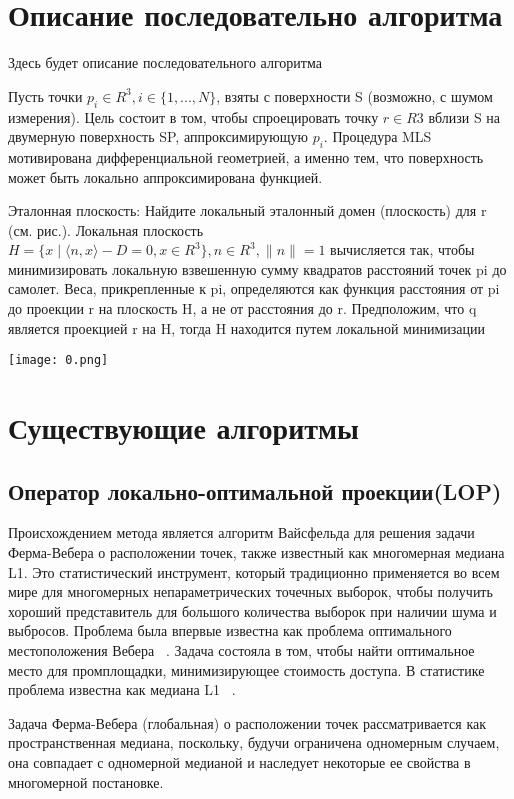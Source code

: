 

\section{Описание последовательно алгоритма}
Здесь будет описание последовательного алгоритма  

Пусть точки $p_i \in R^{3}, i \in \{1, . . . , N\}$, взяты с
поверхности S (возможно, с шумом измерения). Цель состоит в том, чтобы спроецировать точку $r \in R3$ вблизи S на двумерную поверхность SP, аппроксимирующую $p_i$. Процедура MLS мотивирована дифференциальной геометрией, а именно тем, что поверхность может быть локально аппроксимирована функцией.

Эталонная плоскость: 
Найдите локальный эталонный домен (плоскость) для r (см. рис.). Локальная плоскость $ H = \{x \mid \langle n, x \rangle - D = 0, x  \in R^{3}\}, n \in R^{3},  \parallel n \parallel = 1 $ вычисляется так, чтобы минимизировать локальную взвешенную сумму квадратов расстояний точек pi до самолет. Веса, прикрепленные к pi, определяются как функция расстояния от pi до проекции r на плоскость H, а не от расстояния до r. Предположим, что q является проекцией r на H, тогда H находится путем локальной минимизации

\texttt{[image: 0.png]}


\section{Существующие алгоритмы}
\subsection{Оператор локально-оптимальной проекции(LOP)}
Происхождением метода является алгоритм Вайсфельда для решения задачи Ферма-Вебера о расположении точек, также известный как многомерная медиана L1. Это статистический инструмент, который традиционно применяется во всем мире для многомерных непараметрических точечных выборок, чтобы получить хороший представитель для большого количества выборок при наличии шума и выбросов. Проблема была впервые известна как проблема оптимального местоположения Вебера ~\cite{WEBER}. Задача состояла в том, чтобы найти оптимальное место для промплощадки, минимизирующее стоимость доступа. В статистике проблема известна как медиана L1 ~\cite{BROWN, SMALL}.

Задача Ферма-Вебера (глобальная) о расположении точек рассматривается как пространственная медиана, поскольку, будучи ограничена одномерным случаем, она совпадает с одномерной медианой и наследует некоторые ее свойства в многомерной постановке.

